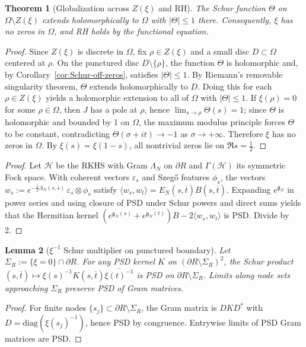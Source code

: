 \documentclass[11pt]{article}
\newtheorem{theorem}{Theorem}
\newtheorem{lemma}[theorem]{Lemma}
\theoremstyle{definition}
\theoremstyle{remark}
\begin{document}
\begin{theorem}[Globalization across \(Z(\xi)\) and RH]\label{thm:globalize-RH}
The Schur function \(\Theta\) on \(\Omega\setminus Z(\xi)\) extends holomorphically to \(\Omega\) with \(|\Theta|\le 1\) there. Consequently, \(\xi\) has no zeros in \(\Omega\), and RH holds by the functional equation.
\end{theorem}
\begin{proof}
Since \(Z(\xi)\) is discrete in \(\Omega\), fix \(\rho\in Z(\xi)\) and a small disc \(D\subset\Omega\) centered at \(\rho\). On the punctured disc \(D\setminus\{\rho\}\), the function \(\Theta\) is holomorphic and, by Corollary~\ref{cor:Schur-off-zeros}, satisfies \(|\Theta|\le 1\). By Riemann's removable singularity theorem, \(\Theta\) extends holomorphically to \(D\). Doing this for each \(\rho\in Z(\xi)\) yields a holomorphic extension to all of \(\Omega\) with \(|\Theta|\le 1\). If \(\xi(\rho)=0\) for some \(\rho\in\Omega\), then \(J\) has a pole at \(\rho\), hence \(\lim_{s\to\rho}\Theta(s)=1\); since \(\Theta\) is holomorphic and bounded by 1 on \(\Omega\), the maximum modulus principle forces \(\Theta\) to be constant, contradicting \(\Theta(\sigma+it)\to -1\) as \(\sigma\to+\infty\). Therefore \(\xi\) has no zeros in \(\Omega\). By \(\xi(s)=\xi(1-s)\), all nontrivial zeros lie on \(\Re s=\tfrac12\).
\end{proof}
\begin{proof}
Let \(\mathcal H\) be the RKHS with Gram \(\Lambda_N\) on \(\partial R\) and \(\Gamma(\mathcal H)\) its symmetric Fock space. With coherent vectors \(\varepsilon_s\) and Szeg\H{o} features \(\phi_s\), the vectors \(w_s:=e^{-\frac12\Lambda_N(s,\overline s)}\,\varepsilon_s\otimes\phi_s\) satisfy \(\langle w_s,w_t\rangle=E_N(s,\overline t)B(s,\overline t)\). Expanding \(e^{\mathfrak g_N}\) in power series and using closure of PSD under Schur powers and direct sums yields that the Hermitian kernel \((e^{\mathfrak g_N(s)}+\overline{e^{\mathfrak g_N(t)}})B-2\langle w_s,w_t\rangle\) is PSD. Divide by 2.
\end{proof}

\begin{lemma}[\(\xi^{-1}\) Schur multiplier on punctured boundary]\label{lem:schur-punctured}
Let \(\Sigma_R:=\{\xi=0\}\cap\partial R\). For any PSD kernel \(K\) on \((\partial R\setminus\Sigma_R)^2\), the Schur product \( (s,\overline t)\mapsto \xi(s)^{-1}K(s,\overline t)\overline{\xi(t)^{-1}}\) is PSD on \(\partial R\setminus\Sigma_R\). Limits along node sets approaching \(\Sigma_R\) preserve PSD of Gram matrices.
\end{lemma}
\begin{proof}
For finite nodes \(\{s_j\}\subset\partial R\setminus\Sigma_R\), the Gram matrix is \(D K D^*\) with \(D=\mathrm{diag}(\xi(s_j)^{-1})\), hence PSD by congruence. Entrywise limits of PSD Gram matrices are PSD.
\end{proof}
\end{document}
